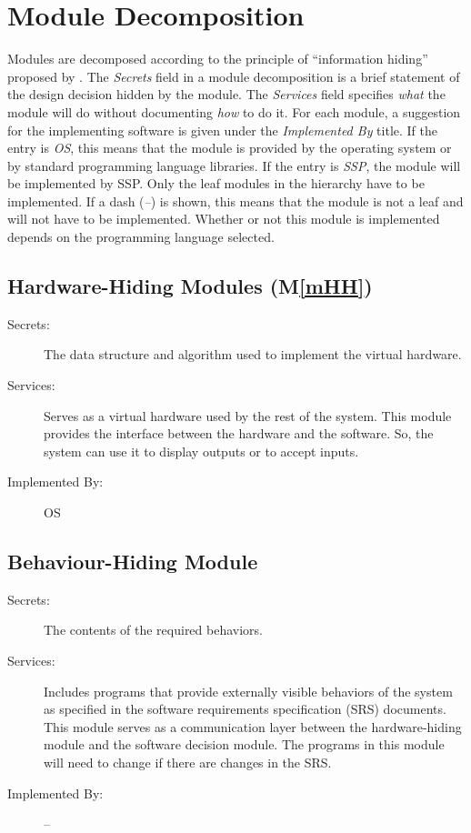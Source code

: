 \documentclass[12pt, titlepage]{article}
\newcommand{\progname}{SSP}
\newcommand{\mref}[1]{M\ref{#1}}
\begin{document}
\section{Module Decomposition} \label{SecMD}

\hspace{3ex}Modules are decomposed according to the principle of
``information hiding'' proposed by \citet{ParnasEtAl1984}. The
\emph{Secrets} field in a module decomposition is a brief statement of
the design decision hidden by the module. The \emph{Services} field
specifies \emph{what} the module will do without documenting
\emph{how} to do it. For each module, a suggestion for the
implementing software is given under the \emph{Implemented By}
title. If the entry is \emph{OS}, this means that the module is
provided by the operating system or by standard programming language
libraries. If the entry is \emph{\progname}, the module will be implemented by 
\progname. Only the leaf modules in the hierarchy have to be implemented. If a 
dash (\emph{--}) is shown, this means that the module is not a leaf and will 
not have to be implemented. Whether or not this module is implemented depends 
on the programming language selected.

\subsection{Hardware-Hiding Modules (\mref{mHH})}

\begin{description}
\item[Secrets:]The data structure and algorithm used to implement the
  virtual hardware.
\item[Services:]Serves as a virtual hardware used by the rest of the
  system. This module provides the interface between the hardware and
  the software. So, the system can use it to display outputs or to
  accept inputs.
\item[Implemented By:] OS
\end{description}

\subsection{Behaviour-Hiding Module}

\begin{description}
\item[Secrets:]The contents of the required behaviors.
\item[Services:]Includes programs that provide externally visible
  behaviors of the system as specified in the software requirements
  specification (SRS) documents. This module serves as a communication
  layer between the hardware-hiding module and the software decision
  module. The programs in this module will need to change if there are
  changes in the SRS.
\item[Implemented By:] --
\end{description}
\end{document}
